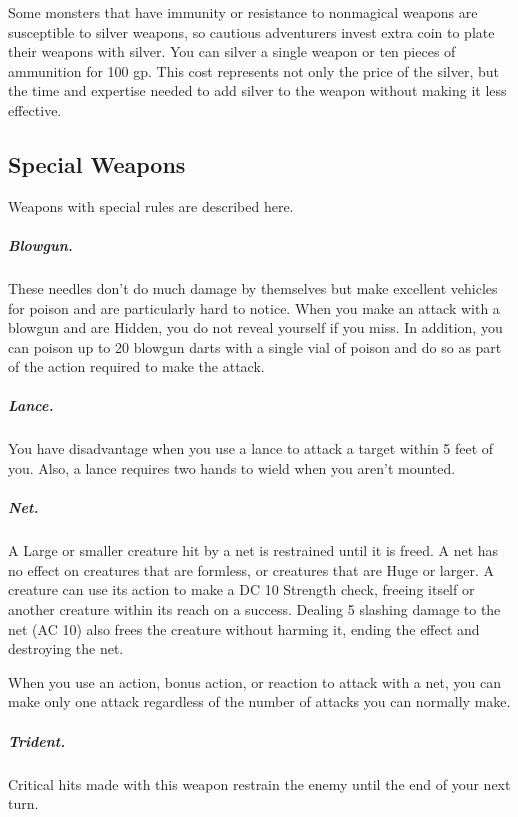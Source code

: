 Some monsters that have immunity or resistance to nonmagical weapons are susceptible to silver weapons, so cautious adventurers invest extra coin to plate their weapons with silver. You can silver a single weapon or ten pieces of ammunition for 100 gp. This cost represents not only the price of the silver, but the time and expertise needed to add silver to the weapon without making it less effective.

\subsection{Special Weapons}

Weapons with special rules are described here.

\subparagraph*{Blowgun.} These needles don't do much damage by themselves but make excellent vehicles for poison and are particularly hard to notice. When you make an attack with a blowgun and are Hidden, you do not reveal yourself if you miss. In addition, you can poison up to 20 blowgun darts with a single vial of poison and do so as part of the action required to make the attack.

\subparagraph*{Lance.} You have disadvantage when you use a lance to attack a target within 5 feet of you. Also, a lance requires two hands to wield when you aren't mounted.

\subparagraph*{Net.} A Large or smaller creature hit by a net is restrained until it is freed. A net has no effect on creatures that are formless, or creatures that are Huge or larger. A creature can use its action to make a DC 10 Strength check, freeing itself or another creature within its reach on a success. Dealing 5 slashing damage to the net (AC 10) also frees the creature without harming it, ending the effect and destroying the net.

When you use an action, bonus action, or reaction to attack with a net, you can make only one attack regardless of the number of attacks you can normally make.

\subparagraph*{Trident.} Critical hits made with this weapon restrain the enemy until the end of your next turn.

